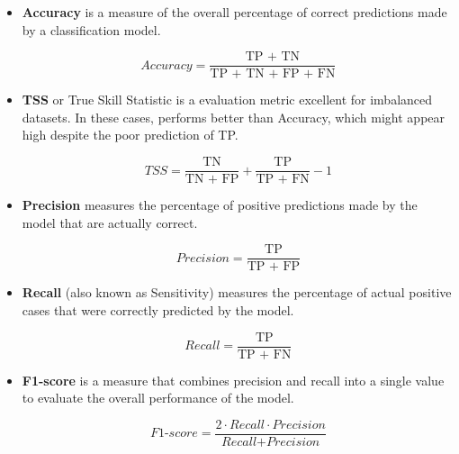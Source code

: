 \begin{itemize}
  \item{

  \textbf{Accuracy} is a measure of the overall percentage of correct predictions made by a classification model.

  \begin{equation}
    \textit{Accuracy} = \frac{\text{TP + TN}}{\text{TP + TN + FP + FN}}
    \label{formula:accuracy}
  \end{equation}

  }
  \item{

  \textbf{TSS} or True Skill Statistic is a evaluation metric excellent for imbalanced datasets. In these cases, performs better than Accuracy, which might appear high despite the poor prediction of TP.

  \begin{equation}
    \textit{TSS} = \frac{\text{TN}}{\text{TN + FP}} + \frac{\text{TP}}{\text{TP + FN}} - 1
    \label{formula:tss}
  \end{equation}

  }
  \item{

  \textbf{Precision} measures the percentage of positive predictions made by the model that are actually correct.

  \begin{equation}
    \textit{Precision} = \frac{\text{TP}}{\text{TP + FP}}
    \label{formula:precision}
  \end{equation}

  }
  \item{

  \textbf{Recall} (also known as Sensitivity)  measures the percentage of actual positive cases that were correctly predicted by the model.

  \begin{equation}
    \textit{Recall} = \frac{\text{TP}}{\text{TP + FN}}
    \label{formula:recall}
  \end{equation}

  }
  \item{

  \textbf{F1-score} is a measure that combines precision and recall into a single value to evaluate the overall performance of the model.


  \begin{equation}
    \textit{F1-score} = \frac{2 \cdot \textit{Recall} \cdot \textit{Precision}}{\textit{Recall} + \textit{Precision}}
    \label{formula:f1}
  \end{equation}
  
  }
\end{itemize} 


